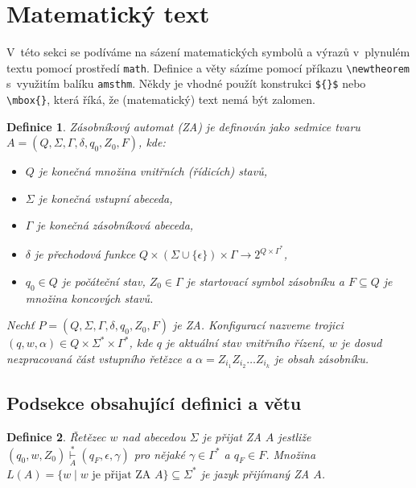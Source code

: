 \documentclass[a4paper, 11pt, twocolumn]{article}
\newtheorem{definice}{Definice}
\begin{document}
\section{Matematický text}
\label{sec:1}
V~této sekci se podíváme na sázení matematických symbolů a výrazů v~plynulém textu pomocí prostředí \texttt{math}. 
Definice a věty sázíme pomocí příkazu \verb|\newtheorem| s~využitím balíku \texttt{amsthm}. 
Někdy je vhodné použít konstrukci \verb|${}$| nebo \verb|\mbox{}|, která říká, že (matematický) text nemá být zalomen.
\begin{definice} 
\label{def:1}
    \emph{Zásobníkový automat} (ZA) je definován jako sedmice tvaru ${A =(Q,\Sigma,\Gamma,\delta,q_{0},Z_{0},F)}$, kde:
    \begin{itemize}

        \item $Q$ je konečná množina \textup{vnitřních (řídicích) stavů},
        \item $\Sigma$ je konečná \textup{vstupní abeceda},
        \item $\Gamma$ je konečná \textup{zásobníková abeceda},
        \item $\delta$ je \textup{přechodová funkce} $Q\times(\Sigma\cup \{ \epsilon \} )\times\Gamma\rightarrow 2^{Q\times\Gamma^{*}}$,
        \item ${q_0 \in Q}$ je \textup{počáteční stav,} $Z_{0}\in\Gamma$ je \textup{startovací symbol zásobníku} a ${F \subseteq Q}$ je množina \textup{koncových stavů.}
    
    \end{itemize}
\par
\textup{Nechť} $P = (Q, \Sigma, \Gamma, \delta , q_{0}, Z_{0}, F )$ \textup{je ZA}. Konfigurací \textup{nazveme trojici} 
$(q, w, \alpha) \in Q \times \Sigma^* \times \Gamma^*$\textup{, kde $q$ je aktuální stav vnitřního řízení, 
$w$ je dosud nezpracovaná část vstupního řetězce a} 
$\alpha = Z_{i_{1}} Z_{i_{2}} \dots Z_{i_{k}}$ \textup{je obsah zásobníku.}
\end{definice}


\subsection{Podsekce obsahující definici a větu}
\begin{definice} 
\label{def:2}
\textup{Řetězec} $ w $ \textup{nad abecedou} $\Sigma$ \textup{je přijat ZA} $A$ jestliže ${(q_0, w, Z_0) \underset{A}{\overset{*}{\vdash}} (q_{F},\epsilon, \gamma) }$ pro nějaké $ \gamma \in \Gamma^* $ a ${q_F \in F}$.
Množina ${L(A)=\{w \mid w}\mbox{ je přijat ZA }A\}\subseteq\Sigma^*$ je \textup{jazyk přijímaný ZA $ A $.}
\end{definice}
\end{document}
